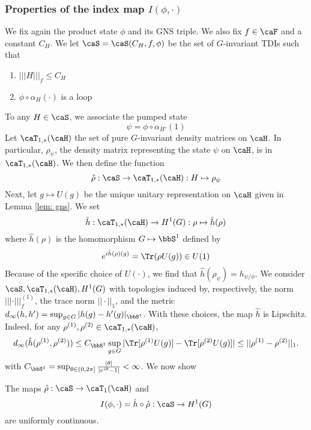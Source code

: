 \subsubsection{Properties of the index map $I(\phi,\cdot)$}

We fix again the product state $\phi$  and its GNS triple. We also fix $f\in\caF$ and a constant $C_H$.  
We let  $\caS=\caS(C_H,f,\phi)$ be the set of $G$-invariant TDIs such that
\begin{enumerate}
	\item $|||H|||_f \leq C_H$
	\item $\phi\circ\alpha_H(\cdot)$ is a loop
\end{enumerate}
To any $H \in \caS$, we associate the pumped state 
$$
\psi=\phi\circ\alpha_{H'}(1)
$$
Let  $\caT_{1,*}(\caH)$ the set of pure $G$-invariant density matrices on $\caH$. In particular,  $\rho_\psi$, the density matrix representing the state $\psi$ on $\caH$, is in $\caT_{1,*}(\caH)$.
We then define the function
$$
\hat\rho: \caS\to \caT_{1,*}(\caH): H\mapsto \rho_\psi
$$
Next, let $g\mapsto U(g)$ be the unique unitary representation on $\caH$ given in Lemma \ref{lem: gns}. We set 
$$
\hat{h}:  \caT_{1,*}(\caH) \to H^1(G): \rho \mapsto \hat{h}(\rho)
$$
where $\hat{h}(\rho)$ is the homomorphism $G\mapsto \bbS^1$ defined by 
\begin{equation}\label{expression for charge}
	e^{i \hat{h}(\rho)(g)}=\Tr( \rho U(g)) \in U(1)  
\end{equation}
Because of the specific choice of $U(\cdot)$, we find that $\hat{h}(\rho_\psi)=h_{\psi/\phi}$. 
We consider $\caS,\caT_{1,*}(\caH), H^1(G)$ with  topologies induced by, respectively, the norm $|||\cdot|||^{(1)}_f$, the trace norm $||\cdot ||_1$, and the metric $d_\infty(h,h')=\sup_{g\in G}|h(g)-h'(g)|_{\bbS^1}$.  With these choices, the map $\hat{h}$ is Lipschitz. Indeed, for any $\rho^{(1)},\rho^{(2)} \in \caT_{1,*}(\caH) $,
$$
d_{\infty}(\hat{h}(\rho^{(1)},\rho^{(2)})) \leq 
C_{\bbS^1} \sup_{g\in G} |\Tr [\rho^{(1)} U(g)] -\Tr [\rho^{(2)} U(g)] | \leq ||\rho^{(1)}-\rho^{(2)}||_1. 
$$
with $ C_{\bbS^1}=\sup_{\theta\in (0,2\pi] } \frac{|\theta|}{ |e^{i\theta}-1|}  <\infty $. 
We now show 
\begin{lemma}\label{lem: uniform cont index}
	The maps
	$ \hat{\rho}: \caS \to \caT_1(\caH)$ and 
	$$
	I(\phi,\cdot)=\hat h\circ \hat\rho:   \caS \to H^1(G)  
	$$
	are uniformly continuous. 
\end{lemma}
